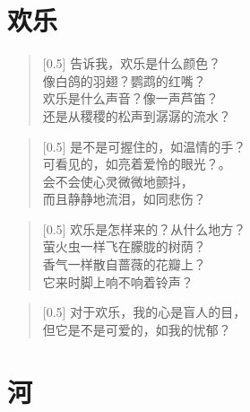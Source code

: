 \documentclass[12pt,UTF-8,openany]{ctexbook}
\begin{document}
\chapter{欢乐}

\begin{normalsize}
    
    \begin{verse}[0.5\linewidth]
        告诉我，欢乐是什么颜色？ \\
        像白鸽的羽翅？鹦鹉的红嘴？ \\
        欢乐是什么声音？像一声芦笛？ \\
        还是从稷稷的松声到潺潺的流水？
    \end{verse}
    
    
    \begin{verse}[0.5\linewidth]
        是不是可握住的，如温情的手？ \\
        可看见的，如亮着爱怜的眼光？。 \\
        会不会使心灵微微地颤抖， \\
        而且静静地流泪，如同悲伤？
    \end{verse}
    
    
    \begin{verse}[0.5\linewidth]
        欢乐是怎样来的？从什么地方？ \\
        萤火虫一样飞在朦胧的树荫？ \\
        香气一样散自蔷薇的花瓣上？ \\
        它来时脚上响不响着铃声？
    \end{verse}
    
    
    \begin{verse}[0.5\linewidth]
        对于欢乐，我的心是盲人的目， \\
        但它是不是可爱的，如我的忧郁？
    \end{verse}
    
\end{normalsize}



\chapter{河}
\end{document}
